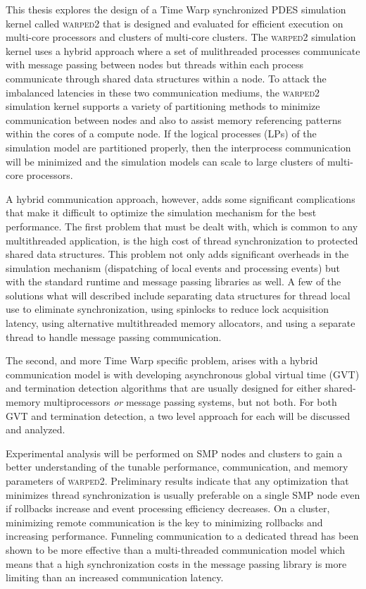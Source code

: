 \documentclass[11pt]{book}
\begin{document}
This thesis explores the design of a Time Warp synchronized PDES simulation kernel called
\textsc{warped2} that is designed and evaluated for efficient execution on multi-core processors and
clusters of multi-core clusters.  The \textsc{warped2} simulation kernel uses a hybrid approach
where a set of mulithreaded processes communicate with message passing between nodes but threads
within each process communicate through shared data structures within a node.  To attack the
imbalanced latencies in these two communication mediums, the \textsc{warped2} simulation kernel
supports a variety of partitioning methods to minimize communication between nodes and also to
assist memory referencing patterns within the cores of a compute node.  If the logical processes
(LPs) of the simulation model are partitioned properly, then the interprocess communication will be
minimized and the simulation models can scale to large clusters of multi-core processors.

A hybrid communication approach, however, adds some significant complications that make it difficult
to optimize the simulation mechanism for the best performance.  The first problem that must be dealt
with, which is common to any multithreaded application, is the high cost of thread synchronization
to protected shared data structures.  This problem not only adds significant overheads in the
simulation mechanism (dispatching of local events and processing events) but with the standard
runtime and message passing libraries as well.  A few of the solutions what will described include
separating data structures for thread local use to eliminate synchronization, using spinlocks to
reduce lock acquisition latency, using alternative multithreaded memory allocators, and using a
separate thread to handle message passing communication.

The second, and more Time Warp specific problem, arises with a hybrid communication model is with
developing asynchronous global virtual time (GVT) and termination detection algorithms that are
usually designed for either shared-memory multiprocessors \emph{or} message passing systems, but not
both.  For both GVT and termination detection, a two level approach for each will be discussed and
analyzed.

Experimental analysis will be performed on SMP nodes and clusters to gain a better understanding of
the tunable performance, communication, and memory parameters of \textsc{warped2}.  Preliminary
results indicate that any optimization that minimizes thread synchronization is usually preferable
on a single SMP node even if rollbacks increase and event processing efficiency decreases.  On a
cluster, minimizing remote communication is the key to minimizing rollbacks and increasing
performance.  Funneling communication to a dedicated thread has been shown to be more effective than
a multi-threaded communication model which means that a high synchronization costs in the message
passing library is more limiting than an increased communication latency.
\end{document}
